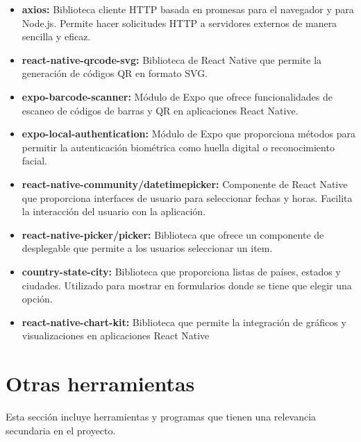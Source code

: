 \begin{itemize}
\begin{itemize}

\item \textbf{axios:} Biblioteca cliente HTTP basada en promesas para el navegador y para Node.js. Permite hacer solicitudes HTTP a servidores externos de manera sencilla y eficaz.

\item \textbf{react-native-qrcode-svg:} Biblioteca de React Native que permite la generación de códigos QR en formato SVG.

\item \textbf{expo-barcode-scanner:} Módulo de Expo que ofrece funcionalidades de escaneo de códigos de barras y QR en aplicaciones React Native.

\item \textbf{expo-local-authentication:} Módulo de Expo que proporciona métodos para permitir la autenticación biométrica como huella digital o reconocimiento facial.

\item \textbf{react-native-community/datetimepicker:} Componente de React Native que proporciona interfaces de usuario para seleccionar fechas y horas.
Facilita la interacción del usuario con la aplicación.

\item \textbf{react-native-picker/picker:} Biblioteca que ofrece un componente de desplegable que permite a los usuarios seleccionar un item. 

\item \textbf{country-state-city:} Biblioteca que proporciona listas de países, estados y ciudades. Utilizado para mostrar en formularios donde se tiene que elegir una opción. 

\item \textbf{react-native-chart-kit:} Biblioteca que permite la integración de gráficos y visualizaciones en aplicaciones React Native

\end{itemize}

\end{itemize}


\section{Otras herramientas}

Esta sección incluye herramientas y programas que tienen una relevancia secundaria en el proyecto.

